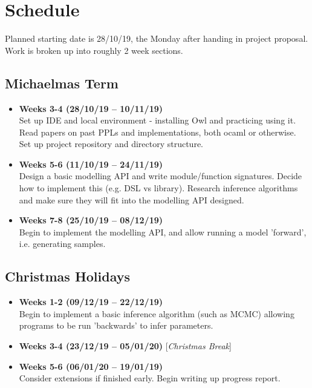 \section*{Schedule}
Planned starting date is {28/10/19}, the Monday after handing in project proposal. Work is broken up into roughly 2 week sections.

\subsection*{Michaelmas Term}
\begin{itemize}
      \item {\bf Weeks 3-4 (28/10/19 -- 10/11/19)} \\ Set up IDE and local environment - installing Owl and practicing using it. Read papers on past PPLs and implementations, both ocaml or otherwise. Set up project repository and directory structure.
      \item \textbf{Weeks 5-6 (11/10/19 -- 24/11/19)} \\ Design a basic modelling API and write module/function signatures. Decide how to implement this (e.g. DSL vs library). Research inference algorithms and make sure they will fit into the modelling API designed.
      \item \textbf{Weeks 7-8 (25/10/19 -- 08/12/19)} \\ Begin to implement the modelling API, and allow running a model 'forward', i.e. generating samples.
\end{itemize}
\subsection*{Christmas Holidays}
\begin{itemize}
      \item \textbf{Weeks 1-2 (09/12/19 -- 22/12/19)}\\ Begin to implement a basic inference algorithm (such as MCMC) allowing programs to be run 'backwards' to infer parameters.
      \item \textbf{Weeks 3-4 (23/12/19 -- 05/01/20)} [\textit{Christmas Break}]
      \item \textbf{Weeks 5-6 (06/01/20 -- 19/01/19)}\\ Consider extensions if finished early. Begin writing up progress report.
\end{itemize}
